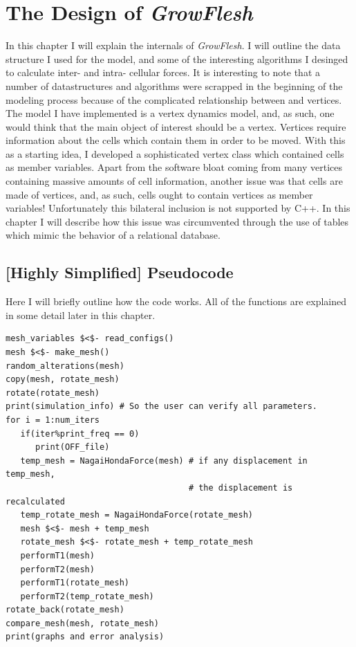 \chapter{The Design of \emph{GrowFlesh}}
In this chapter I will explain the internals of \emph{GrowFlesh}. I will outline the data structure I used for the model, and some of the interesting algorithms I desinged to calculate inter- and intra- cellular forces. It is interesting to note that a number of datastructures and algorithms were scrapped in the beginning of the modeling process because of the complicated relationship between and vertices. The model I have implemented is a vertex dynamics model, and, as such, one would think that the main object of interest should be a vertex. Vertices require information about the cells which contain them in order to be moved. With this as a starting idea, I developed a sophisticated vertex class which contained cells as member variables. Apart from the software bloat coming from many vertices containing massive amounts of cell information, another issue was that cells are made of vertices, and, as such, cells ought to contain vertices as member variables! Unfortunately this bilateral inclusion is not supported by C++. In this chapter I will describe how this issue was circumvented through the use of tables which mimic the behavior of a relational database.

\section{[Highly Simplified] Pseudocode}
Here I will briefly outline how the code works. All of the functions are explained in some detail later in this chapter.
\begin{lstlisting}
mesh_variables $<$- read_configs()
mesh $<$- make_mesh()
random_alterations(mesh)
copy(mesh, rotate_mesh)
rotate(rotate_mesh)
print(simulation_info) # So the user can verify all parameters.
for i = 1:num_iters
   if(iter%print_freq == 0)
      print(OFF_file)
   temp_mesh = NagaiHondaForce(mesh) # if any displacement in temp_mesh,
                                     # the displacement is recalculated
   temp_rotate_mesh = NagaiHondaForce(rotate_mesh)
   mesh $<$- mesh + temp_mesh
   rotate_mesh $<$- rotate_mesh + temp_rotate_mesh
   performT1(mesh)
   performT2(mesh)
   performT1(rotate_mesh)
   performT2(temp_rotate_mesh)
rotate_back(rotate_mesh)
compare_mesh(mesh, rotate_mesh)
print(graphs and error analysis)
\end{lstlisting}

